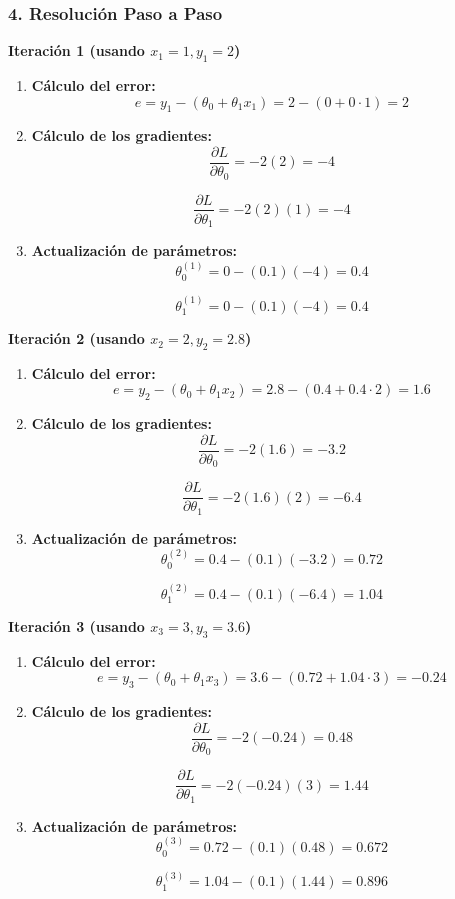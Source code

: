 \documentclass{article}
\begin{document}
\subsubsection*{4. Resolución Paso a Paso}

\textbf{Iteración 1 (usando \( x_1 = 1, y_1 = 2 \))}

\begin{enumerate}
	\item \textbf{Cálculo del error:}
	\[
	e = y_1 - (\theta_0 + \theta_1 x_1) = 2 - (0 + 0 \cdot 1) = 2
	\]
	
	\item \textbf{Cálculo de los gradientes:}
	\[
	\frac{\partial L}{\partial \theta_0} = -2 (2) = -4
	\]
	
	\[
	\frac{\partial L}{\partial \theta_1} = -2 (2) (1) = -4
	\]
	
	\item \textbf{Actualización de parámetros:}
	\[
	\theta_0^{(1)} = 0 - (0.1)(-4) = 0.4
	\]
	
	\[
	\theta_1^{(1)} = 0 - (0.1)(-4) = 0.4
	\]
\end{enumerate}

\textbf{Iteración 2 (usando \( x_2 = 2, y_2 = 2.8 \))}

\begin{enumerate}
	\item \textbf{Cálculo del error:}
	\[
	e = y_2 - (\theta_0 + \theta_1 x_2) = 2.8 - (0.4 + 0.4 \cdot 2) = 1.6
	\]
	
	\item \textbf{Cálculo de los gradientes:}
	\[
	\frac{\partial L}{\partial \theta_0} = -2(1.6) = -3.2
	\]
	
	\[
	\frac{\partial L}{\partial \theta_1} = -2(1.6) (2) = -6.4
	\]
	
	\item \textbf{Actualización de parámetros:}
	\[
	\theta_0^{(2)} = 0.4 - (0.1)(-3.2) = 0.72
	\]
	
	\[
	\theta_1^{(2)} = 0.4 - (0.1)(-6.4) = 1.04
	\]
\end{enumerate}

\textbf{Iteración 3 (usando \( x_3 = 3, y_3 = 3.6 \))}

\begin{enumerate}
	\item \textbf{Cálculo del error:}
	\[
	e = y_3 - (\theta_0 + \theta_1 x_3) = 3.6 - (0.72 + 1.04 \cdot 3) = -0.24
	\]
	
	\item \textbf{Cálculo de los gradientes:}
	\[
	\frac{\partial L}{\partial \theta_0} = -2(-0.24) = 0.48
	\]
	
	\[
	\frac{\partial L}{\partial \theta_1} = -2(-0.24) (3) = 1.44
	\]
	
	\item \textbf{Actualización de parámetros:}
	\[
	\theta_0^{(3)} = 0.72 - (0.1)(0.48) = 0.672
	\]
	
	\[
	\theta_1^{(3)} = 1.04 - (0.1)(1.44) = 0.896
	\]
\end{enumerate}
\end{document}
